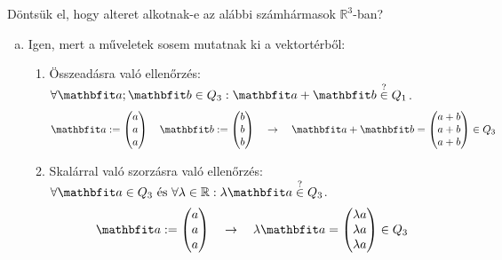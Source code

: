 \documentclass[exercise]{math-standalone}
\begin{document}
\begin{exercise}{%
    Döntsük el, hogy alteret alkotnak-e az alábbi számhármasok
    $\mathbb R^3$-ban?
  }
{\begin{enumerate}[a)]
            \tcbline
      \item Igen, mert a műveletek sosem mutatnak ki a vektortérből:
            \begin{enumerate}[1)]
              \item Összeadásra való ellenőrzés:
                    $\forall \rvec a ; \rvec b \in Q_3:
                      \rvec a + \rvec b \overset{?}{\in} Q_1$.
                    \[
                      \rvec a := \begin{pmatrix} a \\ a \\ a \end{pmatrix}
                      \quad
                      \rvec b := \begin{pmatrix} b \\ b \\ b \end{pmatrix}
                      \quad \rightarrow \quad
                      \rvec a + \rvec b
                      = \begin{pmatrix} a + b \\ a + b \\ a + b \end{pmatrix}
                      \in Q_3
                    \]

              \item Skalárral való szorzásra való ellenőrzés:
                    $\forall \rvec a \in Q_3 \text{ és } \forall \lambda \in \mathbb R:
                      \lambda \rvec a \overset{?}{\in} Q_3$.
                    \[
                      \rvec a := \begin{pmatrix} a \\ a \\ a \end{pmatrix}
                      \quad \rightarrow \quad
                      \lambda \rvec a
                      = \begin{pmatrix} \lambda a \\ \lambda a \\ \lambda a \end{pmatrix}
                      \in Q_3
                    \]
            \end{enumerate}


\end{enumerate}}
\end{exercise}
\end{document}
